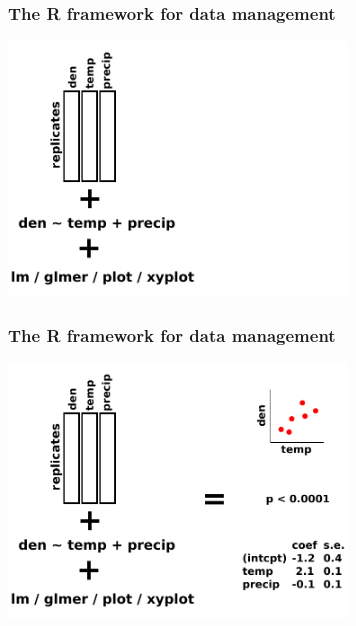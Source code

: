 \documentclass{beamer}
\numberwithin{exercise}{section}
\begin{document}
\begin{frame}
\frametitle{The R framework for data management}
\begin{center}
\vspace{-1cm}
\includegraphics[width=9cm]{dataframe2function3}
\end{center}
\end{frame}

\begin{frame}
\frametitle{The R framework for data management}
\begin{center}
\vspace{-1cm}
\includegraphics[width=9cm]{dataframe2function4}
\end{center}
\end{frame}
\end{document}
